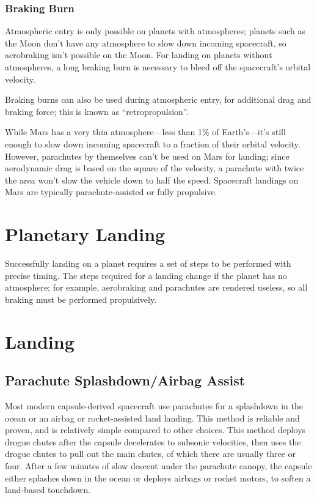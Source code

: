 \subsubsection{Braking Burn}
\label{subsubsec:braking-burn}
  
Atmospheric entry is only possible on planets with atmospheres;
planets such as the Moon don't have any atmosphere to slow down
incoming spacecraft, so aerobraking isn't possible on the Moon. For
landing on planets without atmospheres, a long braking burn is
necessary to bleed off the spacecraft's orbital velocity.


\illustrationsoon

Braking burns can also be used during atmospheric entry, for
additional drag and braking force; this is known as
``retropropulsion''.

While Mars has a very thin atmosphere---less than 1\% of
Earth's---it's still enough to slow down incoming spacecraft to a
fraction of their orbital velocity. However, parachutes by themselves
can't be used on Mars for landing; since aerodynamic drag is based on
the square of the velocity, a parachute with twice the area won't slow
the vehicle down to half the speed. Spacecraft landings on Mars are
typically parachute-assisted or fully propulsive.

\section{Planetary Landing}
\label{ch:planetary-landing}

\afterchapter

Successfully landing on a planet requires a set of steps to be
performed with precise timing. The steps required for a landing change
if the planet has no atmosphere; for example, aerobraking and
parachutes are rendered useless, so all braking must be performed
propulsively.

\section{Landing}

\subsection{Parachute Splashdown/Airbag Assist}

Most modern capsule-derived spacecraft use parachutes for a splashdown
in the ocean or an airbag or rocket-assisted land landing. This method
is reliable and proven, and is relatively simple compared to other
choices. This method deploys drogue chutes after the capsule
decelerates to subsonic velocities, then uses the drogue chutes to
pull out the main chutes, of which there are usually three or
four. After a few minutes of slow descent under the parachute canopy,
the capsule either splashes down in the ocean or deploys airbags or
rocket motors, to soften a land-based touchdown.

